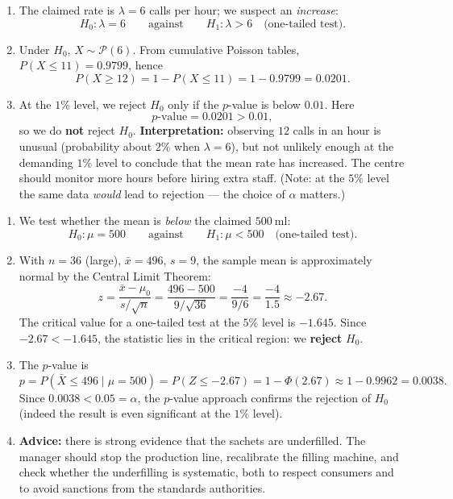 \documentclass[11pt]{article}
\begin{document}
\begin{corrige}
\begin{enumerate}
\item The claimed rate is $\lambda = 6$ calls per hour; we suspect an \emph{increase}:
\[ H_0: \lambda = 6 \qquad \text{against} \qquad H_1: \lambda > 6 \quad \text{(one-tailed test).} \]
\item Under $H_0$, $X \sim \mathcal{P}(6)$. From cumulative Poisson tables, $P(X \leq 11) = 0.9799$, hence
\[ P(X \geq 12) = 1 - P(X \leq 11) = 1 - 0.9799 = 0.0201. \]
\item At the $1\%$ level, we reject $H_0$ only if the $p$-value is below $0.01$. Here
\[ p\text{-value} = 0.0201 > 0.01, \]
so we do \textbf{not} reject $H_0$. \textbf{Interpretation:} observing $12$ calls in an hour is unusual (probability about $2\%$ when $\lambda = 6$), but not unlikely enough at the demanding $1\%$ level to conclude that the mean rate has increased. The centre should monitor more hours before hiring extra staff. (Note: at the $5\%$ level the same data \emph{would} lead to rejection — the choice of $\alpha$ matters.)
\end{enumerate}
\end{corrige}

\begin{corrige}
\begin{enumerate}
\item We test whether the mean is \emph{below} the claimed $500\ \mathrm{ml}$:
\[ H_0: \mu = 500 \qquad \text{against} \qquad H_1: \mu < 500 \quad \text{(one-tailed test).} \]
\item With $n = 36$ (large), $\bar{x} = 496$, $s = 9$, the sample mean is approximately normal by the Central Limit Theorem:
\[ z = \frac{\bar{x} - \mu_0}{s/\sqrt{n}} = \frac{496 - 500}{9/\sqrt{36}} = \frac{-4}{9/6} = \frac{-4}{1.5} \approx -2.67. \]
The critical value for a one-tailed test at the $5\%$ level is $-1.645$. Since $-2.67 < -1.645$, the statistic lies in the critical region: we \textbf{reject} $H_0$.
\item The $p$-value is
\[ p = P(\bar{X} \leq 496 \mid \mu = 500) = P(Z \leq -2.67) = 1 - \Phi(2.67) \approx 1 - 0.9962 = 0.0038. \]
Since $0.0038 < 0.05 = \alpha$, the $p$-value approach confirms the rejection of $H_0$ (indeed the result is even significant at the $1\%$ level).
\item \textbf{Advice:} there is strong evidence that the sachets are underfilled. The manager should stop the production line, recalibrate the filling machine, and check whether the underfilling is systematic, both to respect consumers and to avoid sanctions from the standards authorities.
\end{enumerate}
\end{corrige}
\end{document}
